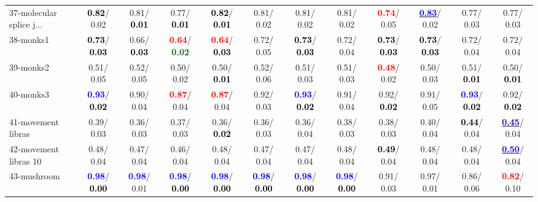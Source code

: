 \begin{table}[h]
\begin{center}
{\begin{tabular}{lc|c|c|c|c|c|c|c|c|c|c}
37-molecular splice j... & \textcolor{black}{\textbf{  0.82}}/  0.02 &   0.81/\textcolor{black}{\textbf{  0.01}} &   0.77/\textcolor{black}{\textbf{  0.01}} & \textcolor{black}{\textbf{  0.82}}/\textcolor{black}{\textbf{  0.01}} &   0.81/  0.02 &   0.81/  0.02 &   0.81/  0.02 & \textcolor{red}{\textbf{  0.74}}/  0.05 & \underline{\textcolor{blue}{\textbf{  0.83}}}/  0.02 &   0.77/  0.03 &   0.77/  0.03 \\
38-monks1 & \textcolor{black}{\textbf{  0.73}}/\textcolor{black}{\textbf{  0.03}} &   0.66/\textcolor{black}{\textbf{  0.03}} & \textcolor{red}{\textbf{  0.64}}/\textcolor{darkgreen}{\textbf{  0.02}} & \textcolor{red}{\textbf{  0.64}}/\textcolor{black}{\textbf{  0.03}} &   0.72/  0.05 & \textcolor{black}{\textbf{  0.73}}/\textcolor{black}{\textbf{  0.03}} &   0.72/  0.04 & \textcolor{black}{\textbf{  0.73}}/\textcolor{black}{\textbf{  0.03}} & \textcolor{black}{\textbf{  0.73}}/\textcolor{black}{\textbf{  0.03}} &   0.72/  0.04 &   0.72/  0.04 \\
39-monks2 &   0.51/  0.05 &   0.52/  0.05 &   0.50/  0.02 &   0.50/\textcolor{black}{\textbf{  0.01}} &   0.52/  0.06 &   0.51/  0.03 &   0.51/  0.03 & \textcolor{red}{\textbf{  0.48}}/  0.02 &   0.50/  0.03 &   0.51/\textcolor{black}{\textbf{  0.01}} &   0.50/\textcolor{black}{\textbf{  0.01}} \\ \hline
40-monks3 & \textcolor{blue}{\textbf{  0.93}}/\textcolor{black}{\textbf{  0.02}} &   0.90/  0.04 & \textcolor{red}{\textbf{  0.87}}/  0.04 & \textcolor{red}{\textbf{  0.87}}/  0.04 &   0.92/  0.03 & \textcolor{blue}{\textbf{  0.93}}/\textcolor{black}{\textbf{  0.02}} &   0.91/  0.04 &   0.92/\textcolor{black}{\textbf{  0.02}} &   0.91/  0.05 & \textcolor{blue}{\textbf{  0.93}}/\textcolor{black}{\textbf{  0.02}} &   0.92/\textcolor{black}{\textbf{  0.02}} \\
41-movement libras &   0.39/  0.03 &   0.36/  0.03 &   0.37/  0.03 &   0.36/\textcolor{black}{\textbf{  0.02}} &   0.36/  0.03 &   0.36/  0.04 &   0.38/  0.03 &   0.38/  0.03 &   0.40/  0.04 & \textcolor{black}{\textbf{  0.44}}/  0.04 & \underline{\textcolor{blue}{\textbf{  0.45}}}/  0.04 \\
42-movement libras 10 &   0.48/  0.04 &   0.47/  0.04 &   0.46/  0.04 &   0.48/  0.04 &   0.47/  0.04 &   0.47/  0.04 &   0.48/  0.04 & \textcolor{black}{\textbf{  0.49}}/  0.04 &   0.48/  0.04 &   0.48/  0.04 & \underline{\textcolor{blue}{\textbf{  0.50}}}/  0.04 \\
43-mushroom & \textcolor{blue}{\textbf{  0.98}}/\textcolor{black}{\textbf{  0.00}} & \textcolor{blue}{\textbf{  0.98}}/  0.01 & \textcolor{blue}{\textbf{  0.98}}/\textcolor{black}{\textbf{  0.00}} & \textcolor{blue}{\textbf{  0.98}}/\textcolor{black}{\textbf{  0.00}} & \textcolor{blue}{\textbf{  0.98}}/\textcolor{black}{\textbf{  0.00}} & \textcolor{blue}{\textbf{  0.98}}/\textcolor{black}{\textbf{  0.00}} & \textcolor{blue}{\textbf{  0.98}}/\textcolor{black}{\textbf{  0.00}} &   0.91/  0.03 &   0.97/  0.01 &   0.86/  0.06 & \textcolor{red}{\textbf{  0.82}}/  0.10 \\

\end{tabular}}
\end{center}
\end{table}
